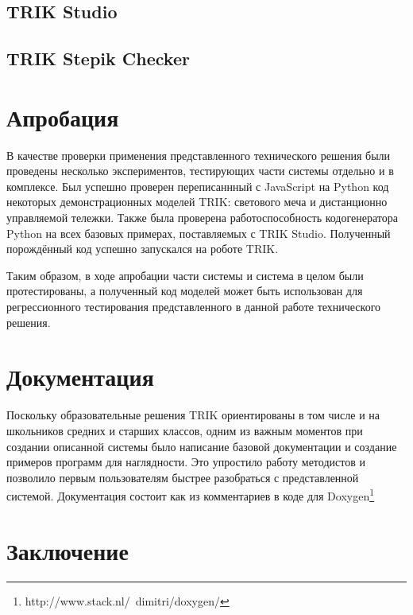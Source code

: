 \documentclass[14pt]{matmex-diploma-custom}
\begin{document}
\subsection{TRIK Studio}

\subsection{TRIK Stepik Checker}



\section{Апробация}
В качестве проверки применения представленного технического решения были проведены несколько экспериментов, тестирующих части системы отдельно и в комплексе. Был успешно проверен переписаннный с JavaScript на Python код некоторых демонстрационных моделей TRIK: светового меча и дистанционно управляемой тележки. Также была проверена работоспособность кодогенератора Python на всех базовых примерах, поставляемых с TRIK Studio. Полученный порождённый код успешно запускался на роботе TRIK. 

Таким образом, в ходе апробации части системы и система в целом были протестированы, а полученный код моделей может быть использован для регрессионного тестирования представленного в данной работе технического решения.

\section{Документация}
Поскольку образовательные решения TRIK ориентированы в том числе и на школьников средних и старших классов, одним из важным моментов при создании описанной системы было написание базовой документации и создание примеров программ для наглядности. Это упростило работу методистов и позволило первым пользователям быстрее разобраться с представленной системой. Документация состоит как из комментариев в коде для Doxygen\footnote{http://www.stack.nl/~dimitri/doxygen/}


\section*{Заключение}
\end{document}

